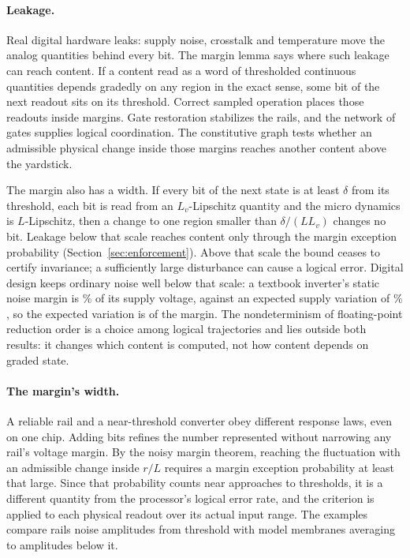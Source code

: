\documentclass[12pt]{article}
\begin{document}
\paragraph{Leakage.} Real digital hardware leaks: supply noise, crosstalk and
temperature move the analog quantities behind every bit. The margin lemma says
where such leakage can reach content. If a content read as a word of
thresholded continuous quantities depends gradedly on any region in the exact
sense, some bit of the next readout sits on its threshold. Correct sampled
operation places those readouts inside margins. Gate restoration stabilizes
the rails, and the network of gates supplies logical coordination. The
constitutive graph tests whether an admissible physical change inside those
margins reaches another content above the yardstick.

The margin also has a width. If every bit of the next state is at least
$\delta$ from its threshold, each bit is read from an $L_v$-Lipschitz quantity
and the micro dynamics is $L$-Lipschitz, then a change to one region smaller
than $\delta/(L L_v)$ changes no bit. Leakage below that scale reaches content
only through the margin exception probability (Section~\ref{sec:enforcement}).
Above that scale the bound ceases to certify invariance; a sufficiently large
disturbance can cause a logical error. Digital design keeps ordinary noise
well below that scale: a textbook inverter's static noise margin is
\ueMarginPercent{}\% of its supply voltage, against an expected supply
variation of \ueSupplyPercent{}\% \citep{rabaey2003}, so the expected variation
is \ueNoiseToMargin{} of the margin. The nondeterminism of floating-point
reduction order is a choice among logical trajectories and lies outside both
results: it changes which content is computed, not how content depends on
graded state.

\paragraph{The margin's width.} A reliable rail and a near-threshold converter
obey different response laws, even on one chip. Adding bits refines the number
represented without narrowing any rail's voltage margin. By the noisy margin
theorem, reaching the fluctuation with an admissible change inside $r/L$
requires a margin exception probability at least that large. Since that
probability counts near approaches to thresholds, it is a different quantity
from the processor's logical error rate, and the criterion is applied to each
physical readout over its actual input range. The examples compare rails \ueMarginToNoise{} noise amplitudes
from threshold with model membranes averaging \uOccDistanceMin{} to
\uOccDistanceMax{} amplitudes below it.
\end{document}
